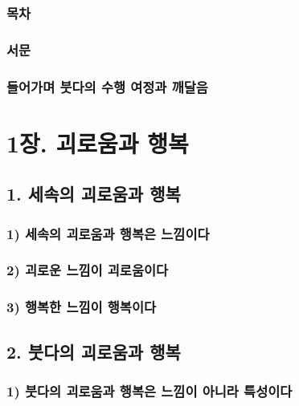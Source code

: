 \documentclass[12pt, a4paper, oneside]{book}
\begin{document}
	\newpage  \null
	\section{목차}

	\newpage  \null
	\section{서문}

	\newpage  \null
	\section{들어가며  붓다의 수행 여정과 깨달음}


	\part{1장. 괴로움과 행복}

	\newpage
	\chapter{1. 세속의 괴로움과 행복}
	\section{1) 세속의 괴로움과 행복은 느낌이다}
	\section{2) 괴로운 느낌이 괴로움이다}
	\section{3) 행복한 느낌이 행복이다}

	\newpage
	\chapter{2. 붓다의 괴로움과 행복}
	\section{1) 붓다의 괴로움과 행복은 느낌이 아니라 특성이다}
\end{document}

